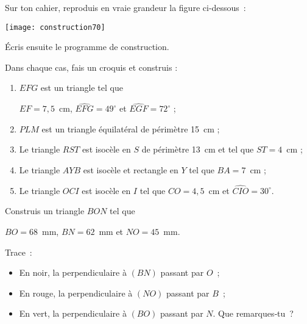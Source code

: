 \begin{exercice}
Sur ton cahier, reproduis en vraie grandeur la figure ci-dessous :
\begin{center} \texttt{[image: construction70]} \end{center}
Écris ensuite le programme de construction.
\end{exercice}


\begin{exercice}
Dans chaque cas, fais un croquis et construis :
 \begin{enumerate}
  \item $EFG$ est un triangle tel que 
  
  $EF = 7,5$ cm, $\widehat{EFG} = 49^\circ$ et $\widehat{EGF} = 72^\circ$ ;
  \item $PLM$ est un triangle équilatéral de périmètre 15 cm ;
  \item Le triangle $RST$ est isocèle en $S$ de périmètre 13 cm et tel que $ST = 4$ cm ;
  \item Le triangle $AYB$ est isocèle et rectangle en $Y$ tel que $BA = 7$ cm ;
  \item Le triangle $OCI$ est isocèle en $I$ tel que $CO = 4,5$ cm et $\widehat{CIO} = 30^\circ$.
  \end{enumerate}
\end{exercice}


\vspace{3em}



\begin{exercice}
Construis un triangle $BON$ tel que 

$BO = 68$ mm, $BN = 62$ mm et $NO = 45$ mm.

Trace :
\begin{itemize}
 \item En noir, la perpendiculaire à $(BN)$ passant par $O$ ;
 \item En rouge, la perpendiculaire à $(NO)$ passant par $B$ ;
 \item En vert, la perpendiculaire à $(BO)$ passant par $N$. Que remarques‑tu ?
 \end{itemize}
\end{exercice}


